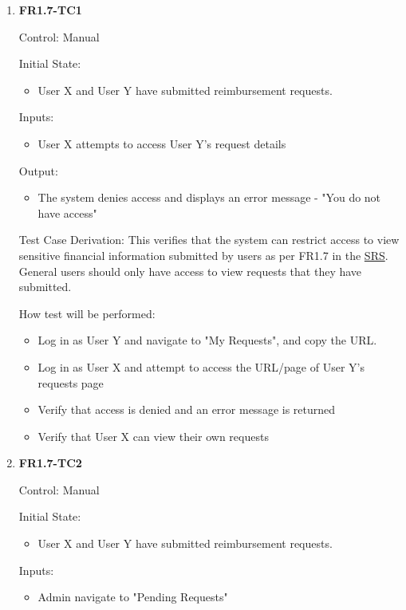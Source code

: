 \documentclass[12pt, titlepage]{article}
\begin{document}
\begin{enumerate}
    \item{\textbf{FR1.7-TC1}}
    
    Control: Manual
    
    Initial State:
    \begin{itemize}
        \item User X and User Y have submitted reimbursement requests.
    \end{itemize}
    
    Inputs: 
    \begin{itemize}
        \item User X attempts to access User Y's request details
    \end{itemize}
    
    Output: 
    \begin{itemize}
        \item The system denies access and displays an error message - "You do not have access"
    \end{itemize}
    
    Test Case Derivation: This verifies that the system can restrict access to view sensitive financial information submitted by users as per FR1.7 in the \href{https://shorturl.at/FdAgR}{SRS}. General users should only have access to view requests that they have submitted.
    
    How test will be performed:
    \begin{itemize}
        \item Log in as User Y and navigate to "My Requests", and copy the URL.
        \item Log in as User X and attempt to access the URL/page of User Y's requests page
        \item Verify that access is denied and an error message is returned
        \item Verify that User X can view their own requests
    \end{itemize}

    \item{\textbf{FR1.7-TC2}}
    
    Control: Manual
    
    Initial State:
    \begin{itemize}
        \item User X and User Y have submitted reimbursement requests.
    \end{itemize}
    
    Inputs: 
    \begin{itemize}
        \item Admin navigate to "Pending Requests"
    \end{itemize}
    

\end{enumerate}
\end{document}
